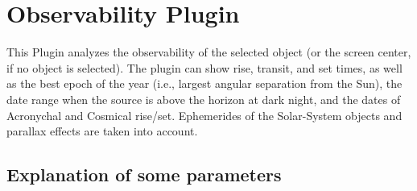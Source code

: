 \section{Observability Plugin}
\label{sec:plugins:Observability}

This Plugin  analyzes the observability of the selected object (or the
screen center, if no object is selected). The plugin can show rise,
transit, and set times, as well as the best epoch of the year (i.e.,
largest angular separation from the Sun), the date range when the
source is above the horizon at dark night, and the dates of Acronychal
and Cosmical rise/set.  Ephemerides of the Solar-System objects and
parallax effects are taken into account.

\subsection*{Explanation of some parameters}

